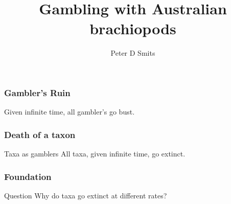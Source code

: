 \documentclass{beamer}
\title{Gambling with Australian brachiopods}
\author{Peter D Smits}
\institute{Committee on Evolutionary Biology, University of Chicago}
\begin{document}
\begin{frame}
  \maketitle
\end{frame}


\begin{frame}
  \frametitle{Gambler's Ruin}

  \begin{definition}
    Given infinite time, all gambler's go bust. 
  \end{definition}
\end{frame}


\begin{frame}
  \frametitle{Death of a taxon}

  \begin{block}{Taxa as gamblers}
    All taxa, given infinite time, go extinct.
  \end{block}
\end{frame}


\begin{frame}
  \frametitle{Foundation}

  \begin{alertblock}{Question}
    Why do taxa go extinct at \alert{different rates}?
  \end{alertblock}
\end{frame}
\end{document}
